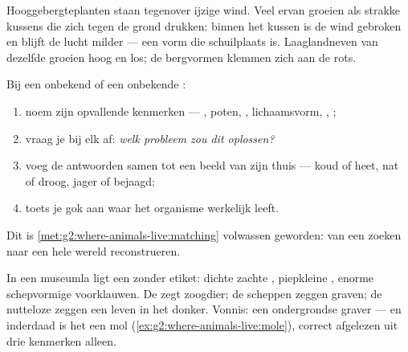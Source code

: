 \begin{example}\label{ex:g4:adapted-to-their-world:alpine}
Hooggebergteplanten staan tegenover ijzige wind. Veel ervan groeien als
strakke kussens die zich tegen de grond drukken: binnen het kussen is de
wind gebroken en blijft de lucht milder --- een vorm die schuilplaats is.
Laaglandneven van dezelfde  groeien hoog en los; de bergvormen
klemmen zich aan de rots.
\end{example}

\begin{method}\label{met:g4:adapted-to-their-world:read}
Bij een onbekend  of een onbekende :
\begin{enumerate}
  \item noem zijn opvallende kenmerken --- , poten, ,
        lichaamsvorm, , ;
  \item vraag je bij elk af: \emph{welk probleem zou dit oplossen?}
  \item voeg de antwoorden samen tot een beeld van zijn thuis --- koud
        of heet, nat of droog, jager of bejaagd;
  \item toets je gok aan waar het organisme werkelijk leeft.
\end{enumerate}
Dit is \cref{met:g2:where-animals-live:matching} volwassen geworden: van
een  zoeken naar een hele wereld reconstrueren.
\end{method}

\begin{example}\label{ex:g4:adapted-to-their-world:mystery}
In een museumla ligt een  zonder etiket: dichte zachte ,
piepkleine , enorme schepvormige voorklauwen. De  zegt
zoogdier; de scheppen zeggen graven; de nutteloze  zeggen een leven
in het donker. Vonnis: een ondergrondse graver --- en inderdaad is het
een mol (\cref{ex:g2:where-animals-live:mole}), correct afgelezen uit
drie kenmerken alleen.
\end{example}

